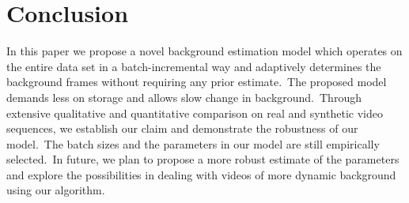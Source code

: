 \documentclass[10pt,twocolumn,letterpaper]{article}
\begin{document}
\vspace{-0.11in}
\section{Conclusion}
\vspace{-0.04in}
In this paper we propose a novel background
estimation model which operates on the entire data set in a
batch-incremental way and adaptively determines the background
frames without requiring any prior estimate.~The proposed model
demands less on storage and allows slow change in
background.~Through extensive qualitative and quantitative
comparison on real and synthetic video sequences, we establish our
claim and demonstrate the robustness of our model.~The batch sizes
and the parameters in our model are still empirically selected.~In
future, we plan to propose a more robust estimate of the parameters
and explore the possibilities in dealing with videos of more dynamic
background using our algorithm.









{\small


}
\end{document}
